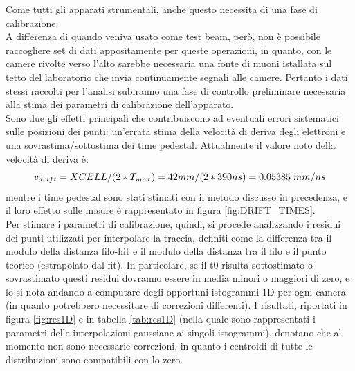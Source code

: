 \documentclass[a4paper,11pt]{book}
\begin{document}
Come tutti gli apparati strumentali, anche questo necessita di una fase di calibrazione.\\
A differenza di quando veniva usato come test beam, però, non è possibile raccogliere set di dati appositamente per queste operazioni, in quanto, con le camere rivolte verso l'alto sarebbe necessaria una fonte di muoni istallata sul tetto del laboratorio che invia continuamente segnali alle camere. Pertanto i dati stessi raccolti per l'analisi subiranno una fase di controllo preliminare necessaria alla stima dei parametri di calibrazione dell'apparato.\\
Sono due gli effetti principali che contribuiscono ad eventuali errori sistematici sulle posizioni dei punti: un'errata stima della velocità di deriva degli elettroni e una sovrastima/sottostima dei time pedestal. Attualmente il valore noto della velocità di deriva è:
\[ v_{drift} = XCELL/(2*T_{max}) = 42mm/(2*390ns) = 0.05385\hspace{1mm} mm/ns \]
mentre i time pedestal sono stati stimati con il metodo discusso in precedenza, e il loro effetto sulle misure è rappresentato in figura \ref{fig:DRIFT_TIMES}.\\
Per stimare i parametri di calibrazione, quindi, si procede analizzando i residui dei punti utilizzati per interpolare la traccia, definiti come la differenza tra il modulo della distanza filo-hit e il modulo della distanza tra il filo e il punto teorico (estrapolato dal fit). In particolare, se il t0 risulta sottostimato o sovrastimato questi residui dovranno essere in media minori o maggiori di zero, e lo si nota andando a computare degli opportuni istogrammi 1D per ogni camera (in quanto potrebbero necessitare di correzioni differenti). I risultati, riportati in figura \ref{fig:res1D} e in tabella \ref{tab:res1D} (nella quale sono rappresentati i parametri delle interpolazioni gaussiane ai singoli istogrammi), denotano che al momento non sono necessarie correzioni, in quanto i centroidi di tutte le distribuzioni sono compatibili con lo zero.
\end{document}
